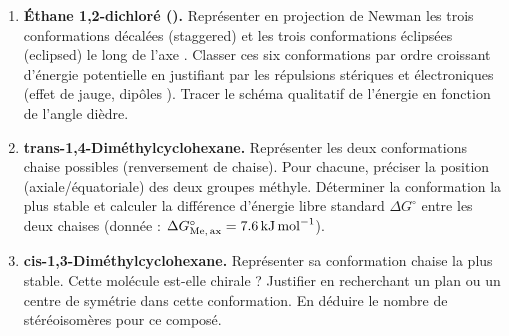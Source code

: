 \documentclass[11pt]{article}
\begin{document}
\begin{exercice}
\begin{enumerate}
    \item \textbf{Éthane 1,2-dichloré ().} Représenter en projection de Newman les trois conformations décalées (staggered) et les trois conformations éclipsées (eclipsed) le long de l'axe . Classer ces six conformations par ordre croissant d'énergie potentielle en justifiant par les répulsions stériques et électroniques (effet de jauge, dipôles ). Tracer le schéma qualitatif de l'énergie en fonction de l'angle dièdre.
    \item \textbf{trans-1,4-Diméthylcyclohexane.} Représenter les deux conformations chaise possibles (renversement de chaise). Pour chacune, préciser la position (axiale/équatoriale) des deux groupes méthyle. Déterminer la conformation la plus stable et calculer la différence d'énergie libre standard $\Delta G^\circ$ entre les deux chaises (donnée : $\Delta G^\circ_{\ce{Me, ax}} = \SI{7.6}{\kilo\joule\per\mole}$).
    \item \textbf{cis-1,3-Diméthylcyclohexane.} Représenter sa conformation chaise la plus stable. Cette molécule est-elle chirale ? Justifier en recherchant un plan ou un centre de symétrie dans cette conformation. En déduire le nombre de stéréoisomères pour ce composé.
\end{enumerate}
\end{exercice}
\end{document}
